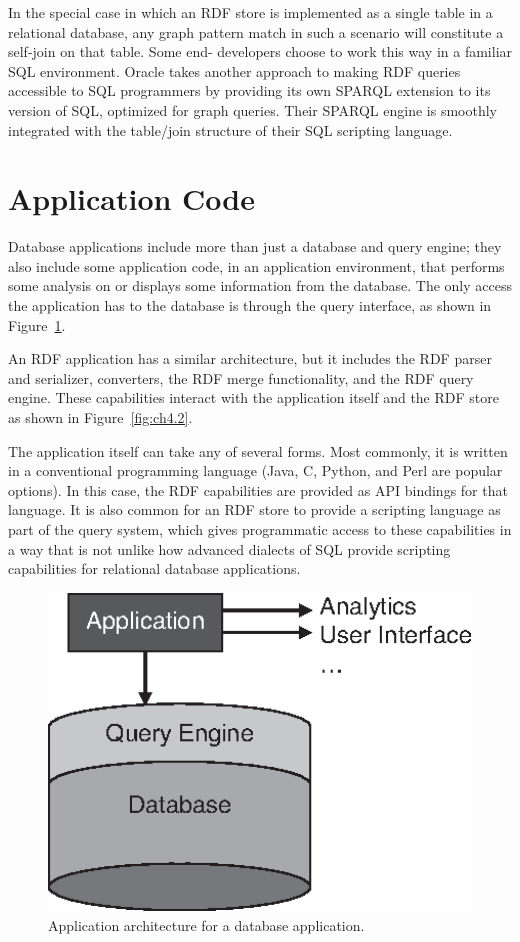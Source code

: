 In the special case in which an RDF store is implemented as a single
table in a relational database, any graph pattern match in such a
scenario will constitute a self-join on that table. Some end- developers
choose to work this way in a familiar SQL environment. Oracle takes
another approach to making RDF queries accessible to SQL programmers by
providing its own SPARQL extension to its version of SQL, optimized for
graph queries. Their SPARQL engine is smoothly integrated with the
table/join structure of their SQL scripting language.

\section{Application Code}

Database applications include more than just a database and query
engine; they also include some application code, in an application
environment, that performs some analysis on or displays some information
from the database. The only access the application has to the database
is through the query interface, as shown in Figure~\ref{fig:ch4.1}.

An RDF application has a similar architecture, but it includes the RDF
parser and serializer, converters, the RDF merge functionality, and the
RDF query engine. These capabilities interact with the application
itself and the RDF store as shown in Figure~\ref{fig:ch4.2}.

The application itself can take any of several forms. Most commonly, it
is written in a conventional programming language (Java, C, Python, and
Perl are popular options). In this case, the RDF capabilities are
provided as API bindings for that language. It is also common for an RDF
store to provide a scripting language as part of the query system, which
gives programmatic access to these capabilities in a way that is not
unlike how advanced dialects of SQL provide scripting capabilities for
relational database applications.

\begin{figure}
    \centering
    \includegraphics[width=5.0in]{media/ch4/f04-01-9780123859655.eps}
    \caption{Application architecture for a database application.}
    \label{fig:ch4.1}
\end{figure}


